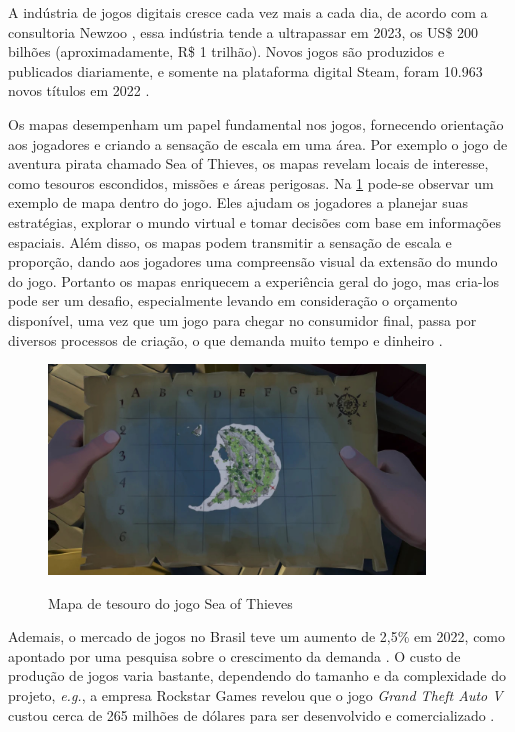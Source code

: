 A indústria de jogos digitais cresce cada vez mais a cada dia, de acordo com a consultoria Newzoo \space\cite{quanto_games_vao_movimentar}, essa indústria tende a ultrapassar em 2023, os US\$ 200 bilhões (aproximadamente, R\$ 1 trilhão). Novos jogos são produzidos e publicados diariamente, e somente na plataforma digital Steam, foram 10.963 novos títulos em 2022\space
\cite{numero_de_jogos_publicados_na_steam}.

Os mapas desempenham um papel fundamental nos jogos, fornecendo orientação aos jogadores e criando a sensação de escala em uma área. Por exemplo o jogo de aventura pirata chamado Sea of Thieves, os mapas revelam locais de interesse, como tesouros escondidos, missões e áreas perigosas. Na \cref{fig:treasureMap} pode-se observar um exemplo de mapa dentro do jogo. Eles ajudam os jogadores a planejar suas estratégias, explorar o mundo virtual e tomar decisões com base em informações espaciais. Além disso, os mapas podem transmitir a sensação de escala e proporção, dando aos jogadores uma compreensão visual da extensão do mundo do jogo. Portanto os mapas enriquecem a experiência geral do jogo, mas cria-los pode ser um desafio, especialmente levando em consideração o orçamento disponível, uma vez que um jogo para chegar no consumidor final, passa por diversos processos de criação, o que demanda muito tempo e dinheiro \cite{video-game-maps, lecafedugeek}.

\begin{figure}[H]
	\caption{Mapa de tesouro do jogo Sea of Thieves}
	\centering %
	\includegraphics[width=10cm]{figures/Treasure_Map.jpg} %
	\label{fig:treasureMap}
\end{figure}

Ademais, o mercado de jogos no Brasil teve um aumento de 2,5\% em 2022, como apontado por uma pesquisa sobre o crescimento da demanda \space \cite{pesquisa_games_brasil}. O custo de produção de jogos varia bastante, dependendo do tamanho e da complexidade do projeto, \emph{e.g.}, a empresa Rockstar Games revelou que o jogo \textit{Grand Theft Auto V} custou cerca de 265 milhões de dólares para ser desenvolvido e comercializado \space
\cite{gta_quanto_custou}.

